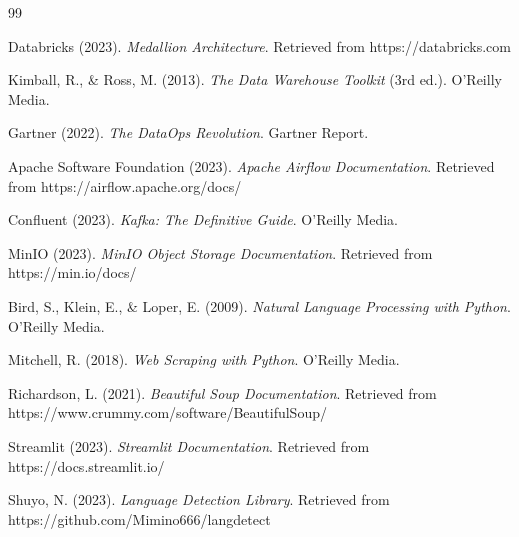 \documentclass[12pt,a4paper]{report}
\begin{document}
\begin{thebibliography}{99}

     Databricks (2023). \textit{Medallion Architecture}. Retrieved from https://databricks.com

     Kimball, R., \& Ross, M. (2013). \textit{The Data Warehouse Toolkit} (3rd ed.). O'Reilly Media.

     Gartner (2022). \textit{The DataOps Revolution}. Gartner Report.

     Apache Software Foundation (2023). \textit{Apache Airflow Documentation}. Retrieved from https://airflow.apache.org/docs/

     Confluent (2023). \textit{Kafka: The Definitive Guide}. O'Reilly Media.

     MinIO (2023). \textit{MinIO Object Storage Documentation}. Retrieved from https://min.io/docs/

     Bird, S., Klein, E., \& Loper, E. (2009). \textit{Natural Language Processing with Python}. O'Reilly Media.

     Mitchell, R. (2018). \textit{Web Scraping with Python}. O'Reilly Media.

     Richardson, L. (2021). \textit{Beautiful Soup Documentation}. Retrieved from https://www.crummy.com/software/BeautifulSoup/

     Streamlit (2023). \textit{Streamlit Documentation}. Retrieved from https://docs.streamlit.io/

     Shuyo, N. (2023). \textit{Language Detection Library}. Retrieved from https://github.com/Mimino666/langdetect

\end{thebibliography}
\end{document}
